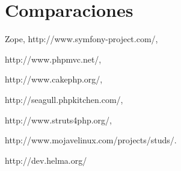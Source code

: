 \section{Comparaciones}
Zope, http://www.symfony-project.com/,

http://www.phpmvc.net/,

http://www.cakephp.org/,

http://seagull.phpkitchen.com/,

http://www.struts4php.org/,

http://www.mojavelinux.com/projects/studs/.

http://dev.helma.org/